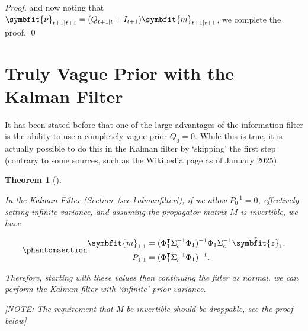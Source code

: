 \documentclass[
]{report}
\newcommand{\bv}[1]{\symbfit{#1}}
\theoremstyle{plain}
\theoremstyle{plain}
\theoremstyle{plain}
\newtheorem{theorem}{Theorem}[section]
\theoremstyle{remark}
\begin{document}
\begin{proof}
and now noting that
\(\bv\nu_{t+1\mid t+1} = (Q_{t+1\mid t} + I_{t+1}) \bv m_{t+1\mid t+1}\),
we complete the proof. \qed
\end{proof}

\section{Truly Vague Prior with the Kalman Filter}\label{sec-vagueprior}

It has been stated before that one of the large advantages of the
information filter is the ability to use a completely vague prior
\(Q_{0}=0\). While this is true, it is actually possible to do this in
the Kalman filter by `skipping' the first step (contrary to some
sources, such as the Wikipedia page as of January 2025).

\begin{theorem}[]\protect\hypertarget{thm-vagueprior}{}\label{thm-vagueprior}

In the Kalman Filter (Section~\ref{sec-kalmanfilter}), if we allow
\(P_{0}^{-1} = 0\), effectively setting infinite variance, and assuming
the propagator matrix \(M\) is invertible, we have

\begin{equation}\phantomsection\label{eq-kalmanvague}{\begin{split}
  \bv m_{1\mid1} &= (\Phi_1^\intercal \Sigma_\epsilon^{-1} \Phi_1)^{-1} \Phi_1 \Sigma_\epsilon^{-1} \tilde{\bv z}_1,\\
  P_{1\mid1} &= (\Phi_1^\intercal \Sigma_\epsilon^{-1} \Phi_1)^{-1}.
\end{split}
}\end{equation}

Therefore, starting with these values then continuing the filter as
normal, we can perform the Kalman filter with `infinite' prior variance.

{{[}NOTE: The requirement that M be invertible should be droppable, see
the proof below{]}}

\end{theorem}
\end{document}
